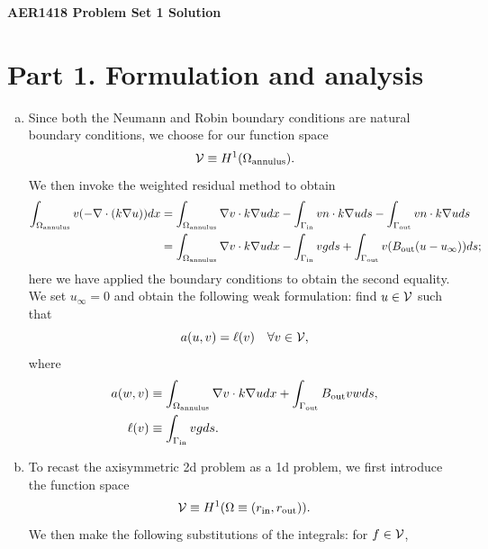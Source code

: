\documentclass[preprint,11pt]{article}
\begin{document}
\begin{Large}\textbf{AER1418 Problem Set 1 Solution}\end{Large} \hfill %

\vspace{1em}

\section*{Part 1. Formulation and analysis}
\begin{enumerate}[(a)]
\item Since both the Neumann and Robin boundary conditions are natural boundary conditions, we choose for our function space
  \begin{equation*}
    \mathcal{V} \equiv H^1(\Omega_{\rm annulus}).
  \end{equation*}
  We then invoke the weighted residual method to obtain
  \begin{align*}
    \int_{\Omega_{\rm annulus}} v (- \nabla \cdot (k \nabla u)) dx
    &=
    \int_{\Omega_{\rm annulus}} \nabla v \cdot k \nabla u dx
    - \int_{\Gamma_{\rm in}} v n \cdot k \nabla u ds
    - \int_{\Gamma_{\rm out}} v n \cdot k \nabla u ds
    \\
    &=
    \int_{\Omega_{\rm annulus}} \nabla v \cdot k \nabla u dx
    - \int_{\Gamma_{\rm in}} v g ds
    + \int_{\Gamma_{\rm out}} v (B_{\rm out} (u  -u_\infty)) ds;
  \end{align*}
  here we have applied the boundary conditions to obtain the second equality.
  We set $u_\infty = 0$ and obtain the following weak formulation: find $u \in \mathcal{V}$ such that
  \begin{equation*}
    a(u,v) = \ell(v) \quad \forall v \in \mathcal{V},
  \end{equation*}
  where
  \begin{align*}
    a(w,v) &\equiv \int_{\Omega_{\rm annulus}} \nabla v \cdot k \nabla u dx + \int_{\Gamma_{\rm out}} B_{\rm out} v w ds, \\
    \ell(v) &\equiv \int_{\Gamma_{\rm in}} v g ds .
  \end{align*}
\item To recast the axisymmetric 2d problem as a 1d problem, we first introduce the function space
  \begin{equation*}
    \mathcal{V} \equiv H^1(\Omega \equiv (r_{\rm in},r_{\rm out})).
  \end{equation*}
  We then make the following substitutions of the integrals: for $f \in \mathcal{V}$,

\end{enumerate}
\end{document}
